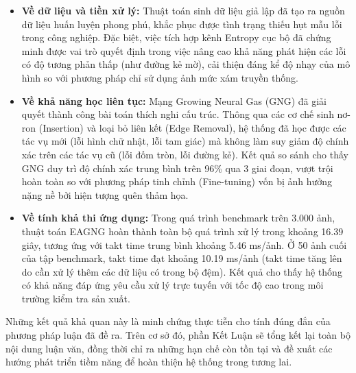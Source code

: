 \begin{itemize}
    \item \textbf{Về dữ liệu và tiền xử lý:} Thuật toán sinh dữ liệu giả lập đã tạo ra nguồn dữ liệu huấn luyện phong phú, khắc phục được tình trạng thiếu hụt mẫu lỗi trong công nghiệp. Đặc biệt, việc tích hợp kênh Entropy cục bộ đã chứng minh được vai trò quyết định trong việc nâng cao khả năng phát hiện các lỗi có độ tương phản thấp (như đường kẻ mờ), cải thiện đáng kể độ nhạy của mô hình so với phương pháp chỉ sử dụng ảnh mức xám truyền thống.
    
    \item \textbf{Về khả năng học liên tục:} Mạng Growing Neural Gas (GNG) đã giải quyết thành công bài toán thích nghi cấu trúc. Thông qua các cơ chế sinh nơ-ron (Insertion) và loại bỏ liên kết (Edge Removal), hệ thống đã học được các tác vụ mới (lỗi hình chữ nhật, lỗi tam giác) mà không làm suy giảm độ chính xác trên các tác vụ cũ (lỗi đốm tròn, lỗi đường kẻ). Kết quả so sánh cho thấy GNG duy trì độ chính xác trung bình trên 96\% qua 3 giai đoạn, vượt trội hoàn toàn so với phương pháp tinh chỉnh (Fine-tuning) vốn bị ảnh hưởng nặng nề bởi hiện tượng quên thảm họa.
    
    \item \textbf{Về tính khả thi ứng dụng:} Trong quá trình benchmark trên 3.000 ảnh, thuật toán EAGNG hoàn thành toàn bộ quá trình xử lý trong khoảng 16.39 giây, tương ứng với takt time trung bình khoảng 5.46 ms/ảnh. Ở 50 ảnh cuối của tập benchmark, takt time đạt khoảng 10.19 ms/ảnh (takt time tăng lên do cần xử lý thêm các dữ liệu có trong bộ đệm). Kết quả cho thấy hệ thống có khả năng đáp ứng yêu cầu xử lý trực tuyến với tốc độ cao trong môi trường kiểm tra sản xuất.
\end{itemize}

Những kết quả khả quan này là minh chứng thực tiễn cho tính đúng đắn của phương pháp luận đã đề ra. Trên cơ sở đó, phần Kết Luận sẽ tổng kết lại toàn bộ nội dung luận văn, đồng thời chỉ ra những hạn chế còn tồn tại và đề xuất các hướng phát triển tiềm năng để hoàn thiện hệ thống trong tương lai.